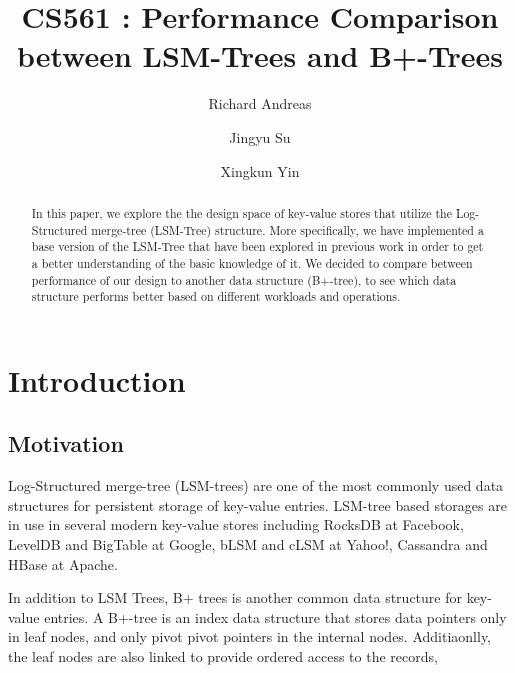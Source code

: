 \documentclass[sigconf]{acmart}
\begin{document}
    \title{CS561 : Performance Comparison between LSM-Trees and B+-Trees}

    \author{Richard Andreas}
    \author{Jingyu Su}
    \author{Xingkun Yin}

    \begin{abstract}
        In this paper, we explore the the design space of key-value stores that utilize the Log-Structured merge-tree (LSM-Tree) structure. More specifically, we have implemented a base version of the LSM-Tree that have been explored in previous work in order to get a better understanding of the basic knowledge of it. We decided to compare between performance of our design to another data structure (B+-tree), to see which data structure performs better based on different workloads and operations.
    \end{abstract}

    \maketitle

    \section{Introduction}

    \subsection{Motivation}


    Log-Structured merge-tree (LSM-trees) are one of the most commonly used data structures for persistent storage of key-value entries. LSM-tree based storages are in use in several modern key-value stores including RocksDB at
    Facebook, LevelDB and BigTable at Google, bLSM and cLSM at Yahoo!, Cassandra
    and HBase at Apache.

    In addition to LSM Trees, B+ trees is another common data structure for key-value entries. A B+-tree is an index data structure that stores data pointers only in leaf nodes, and only pivot pivot pointers in the internal nodes. Additiaonlly, the leaf nodes are also linked to provide ordered access to the records,
\end{document}
